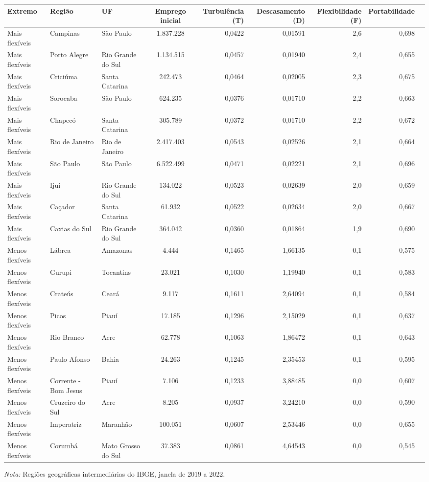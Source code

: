 \providecommand{\toprule}{\hline\hline}
\providecommand{\midrule}{\hline}
\providecommand{\bottomrule}{\hline\hline}
\providecommand{\addlinespace}[1][]{}
{\small
\renewcommand{\arraystretch}{1.12}
\begin{tabular}{lllcrrrrr}
\toprule
Extremo & Região & UF & Emprego inicial & Turbulência (T) & Descasamento (D) & Flexibilidade (F) & Portabilidade \\
\midrule
Mais flexíveis & Campinas & São Paulo & 1.837.228 & 0,0422 & 0,01591 & 2,6 & 0,698 \\
Mais flexíveis & Porto Alegre & Rio Grande do Sul & 1.134.515 & 0,0457 & 0,01940 & 2,4 & 0,655 \\
Mais flexíveis & Criciúma & Santa Catarina & 242.473 & 0,0464 & 0,02005 & 2,3 & 0,675 \\
Mais flexíveis & Sorocaba & São Paulo & 624.235 & 0,0376 & 0,01710 & 2,2 & 0,663 \\
Mais flexíveis & Chapecó & Santa Catarina & 305.789 & 0,0372 & 0,01710 & 2,2 & 0,672 \\
Mais flexíveis & Rio de Janeiro & Rio de Janeiro & 2.417.403 & 0,0543 & 0,02526 & 2,1 & 0,664 \\
Mais flexíveis & São Paulo & São Paulo & 6.522.499 & 0,0471 & 0,02221 & 2,1 & 0,696 \\
Mais flexíveis & Ijuí & Rio Grande do Sul & 134.022 & 0,0523 & 0,02639 & 2,0 & 0,659 \\
Mais flexíveis & Caçador & Santa Catarina & 61.932 & 0,0522 & 0,02634 & 2,0 & 0,667 \\
Mais flexíveis & Caxias do Sul & Rio Grande do Sul & 364.042 & 0,0360 & 0,01864 & 1,9 & 0,690 \\
\addlinespace[3pt]
Menos flexíveis & Lábrea & Amazonas & 4.444 & 0,1465 & 1,66135 & 0,1 & 0,575 \\
Menos flexíveis & Gurupi & Tocantins & 23.021 & 0,1030 & 1,19940 & 0,1 & 0,583 \\
Menos flexíveis & Crateús & Ceará & 9.117 & 0,1611 & 2,64094 & 0,1 & 0,584 \\
Menos flexíveis & Picos & Piauí & 17.185 & 0,1296 & 2,15029 & 0,1 & 0,637 \\
Menos flexíveis & Rio Branco & Acre & 62.778 & 0,1063 & 1,86472 & 0,1 & 0,643 \\
Menos flexíveis & Paulo Afonso & Bahia & 24.263 & 0,1245 & 2,35453 & 0,1 & 0,595 \\
Menos flexíveis & Corrente - Bom Jesus & Piauí & 7.106 & 0,1233 & 3,88485 & 0,0 & 0,607 \\
Menos flexíveis & Cruzeiro do Sul & Acre & 8.205 & 0,0937 & 3,24210 & 0,0 & 0,590 \\
Menos flexíveis & Imperatriz & Maranhão & 100.051 & 0,0607 & 2,53446 & 0,0 & 0,655 \\
Menos flexíveis & Corumbá & Mato Grosso do Sul & 37.383 & 0,0861 & 4,64543 & 0,0 & 0,545 \\
\bottomrule
\end{tabular}
\vspace{2pt}
\par{\footnotesize \textit{Nota:} Regiões geográficas intermediárias do IBGE, janela de 2019 a 2022.}
}
